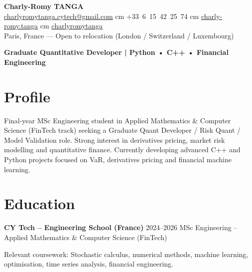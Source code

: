\documentclass[10pt, letterpaper]{article}
\begin{document}
\begin{center}
    \textbf{\LARGE Charly-Romy TANGA} \\[0.2cm]
    
    \mbox{\href{mailto:charlyromytanga.cytech@gmail.com}{\footnotesize\faEnvelope\hspace*{0.1cm}charlyromytanga.cytech@gmail.com}}
     cm
    \mbox{\faPhone\hspace*{0.1cm}+33 6 15 42 25 74}
     cm
    \mbox{\href{https://www.linkedin.com/in/charly-romy-tanga}{\footnotesize\faLinkedin\hspace*{0.1cm}charly-romy.tanga}}
     cm
    \mbox{\href{https://github.com/charlyromytanga}{\footnotesize\faGithub\hspace*{0.1cm}charlyromytanga}}
    \\[0.2cm]
    Paris, France — Open to relocation (London / Switzerland / Luxembourg)
\end{center}

\vspace{0.2cm}

\textbf{Graduate Quantitative Developer | Python • C++ • Financial Engineering}

\section*{Profile}

Final-year MSc Engineering student in Applied Mathematics \& Computer Science (FinTech track) seeking a Graduate Quant Developer / Risk Quant / Model Validation role. Strong interest in derivatives pricing, market risk modelling and quantitative finance. Currently developing advanced C++ and Python projects focused on VaR, derivatives pricing and financial machine learning.

\section*{Education}

\textbf{CY Tech – Engineering School (France)} \hfill 2024–2026  
MSc Engineering – Applied Mathematics \& Computer Science (FinTech)

Relevant coursework: Stochastic calculus, numerical methods, machine learning, optimisation, time series analysis, financial engineering.

\end{document}
